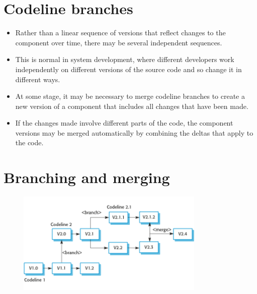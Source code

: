 \section{Codeline branches}
\begin{itemize}

\item Rather than a linear sequence of versions that reflect changes to the component over time, there may be several independent sequences.

   \item This is normal in system development, where different developers work independently on different versions of the source code and so change it in different ways.

\item At some stage, it may be necessary to merge codeline branches to create a new version of a component that includes all changes that have been made.

   \item If the changes made involve different parts of the code, the component versions may be merged automatically by combining the deltas that apply to the code.

\end{itemize}
\section{Branching and merging}
\begin{figure}[h!]
    \centering
    \includegraphics[width = 0.8\textwidth]{./figures/L8_6.png}
    \caption{}
    \label{fig:L8_6}
\end{figure}




